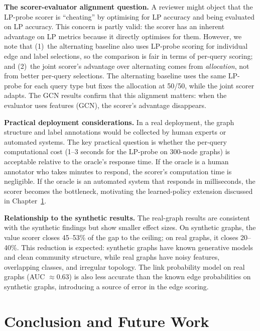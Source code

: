 \documentclass[12pt,a4paper,oneside]{report}
\begin{document}
\textbf{The scorer-evaluator alignment question.} A reviewer might object that the LP-probe scorer is ``cheating'' by optimising for LP accuracy and being evaluated on LP accuracy. This concern is partly valid: the scorer has an inherent advantage on LP metrics because it directly optimises for them. However, we note that (1)~the alternating baseline also uses LP-probe scoring for individual edge and label selections, so the comparison is fair in terms of per-query scoring; and (2)~the joint scorer's advantage over alternating comes from \emph{allocation}, not from better per-query selections. The alternating baseline uses the same LP-probe for each query type but fixes the allocation at 50/50, while the joint scorer adapts. The GCN results confirm that this alignment matters: when the evaluator uses features (GCN), the scorer's advantage disappears.

\textbf{Practical deployment considerations.} In a real deployment, the graph structure and label annotations would be collected by human experts or automated systems. The key practical question is whether the per-query computational cost (1--3 seconds for the LP-probe on 300-node graphs) is acceptable relative to the oracle's response time. If the oracle is a human annotator who takes minutes to respond, the scorer's computation time is negligible. If the oracle is an automated system that responds in milliseconds, the scorer becomes the bottleneck, motivating the learned-policy extension discussed in Chapter~\ref{ch:conclusion}.

\textbf{Relationship to the synthetic results.} The real-graph results are consistent with the synthetic findings but show smaller effect sizes. On synthetic graphs, the value scorer closes 45--53\% of the gap to the ceiling; on real graphs, it closes 20--40\%. This reduction is expected: synthetic graphs have known generative models and clean community structure, while real graphs have noisy features, overlapping classes, and irregular topology. The link probability model on real graphs (AUC $\approx 0.63$) is also less accurate than the known edge probabilities on synthetic graphs, introducing a source of error in the edge scoring.


\chapter{Conclusion and Future Work}
\label{ch:conclusion}
\end{document}
